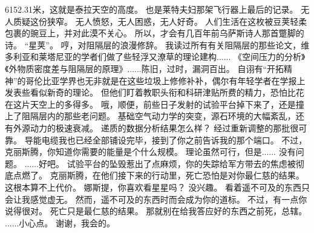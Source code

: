 \documentclass[openany]{book}
\begin{document}
\begin{dialogue}
     6152.31米，这就是泰拉天空的高度。
     也是莱特夫妇那架飞行器上最后的记录。
     无人质疑这份狭窄。
     无人愤怒，无人困惑，无人好奇。
     人们生活在这枚被豆荚轻柔包裹的豌豆上，并对此漠不关心。
     所以，才会有几百年前乌萨斯诗人那首蹩脚的诗。
     “星荚”。
     哼，对阻隔层的浪漫修辞。
     我读过所有有关阻隔层的那些论文，维多利亚和莱塔尼亚的学者们做了些轻浮又潦草的理论建构......
     《空间压力的分析》《外物质密度差与阻隔层的原理》......陈旧，过时，漏洞百出。
     自诩有“开拓精神”的哥伦比亚学界也无非就是在这些垃圾上修修补补，偶尔有年轻学者在学报上发表些看似新奇的理论。
     但他们盯着教职头衔和科研津贴所费的精力，恐怕比花在这片天空上的多得多。
     哦，顺便，前些日子发射的试验平台掉下来了，还是撞上了阻隔层内的那些老问题。
     基础空气动力学的突变，源石环境的大幅紊乱，还有外源动力的极速衰减。
     递质的数据分析结果怎么样？
     经过重新调整的那批很可靠。
     导能电缆我也已经全部铺设完毕，接到了你之前告诉我的那个端口。
     不过，克丽斯腾，你知道你需要的能量是个什么规模。
     理论虽然可行，但是......
     没有问题。
     ......好吧。
     试验平台的坠毁惹出了点麻烦，你的失踪给军方带去的焦虑被彻底点燃了。
     克丽斯腾，在他们接下来的行动里，死亡恐怕是对你最仁慈的结果。
     这根本算不上代价。
     娜斯提，你喜欢看星星吗？
     没兴趣。
     看着遥不可及的东西只会让我感觉虚无。
     然而，遥不可及的东西时而会成为你的道标。
     不过，有一点你说得很对。
     死亡只是最仁慈的结果。
     那就别在给我答应好的东西之前死，总辖。
     ......小心点。
     谢谢，我会的。
\end{dialogue}
\end{document}
